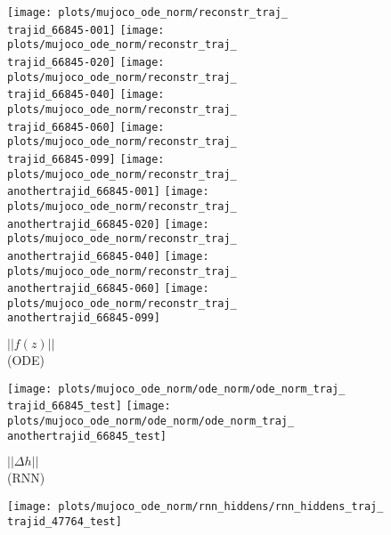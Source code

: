 \documentclass{article}
\begin{document}
\begin{figure*}[b]
\begin{subfigure}[b]{0.9\linewidth}
		\centering
		\texttt{[image: plots/mujoco\_ode\_norm/reconstr\_traj\_\\trajid\_66845-001]}
		\texttt{[image: plots/mujoco\_ode\_norm/reconstr\_traj\_\\trajid\_66845-020]}
		\texttt{[image: plots/mujoco\_ode\_norm/reconstr\_traj\_\\trajid\_66845-040]}
		\texttt{[image: plots/mujoco\_ode\_norm/reconstr\_traj\_\\trajid\_66845-060]}
		\texttt{[image: plots/mujoco\_ode\_norm/reconstr\_traj\_\\trajid\_66845-099]}
		\hfill
		\texttt{[image: plots/mujoco\_ode\_norm/reconstr\_traj\_\\anothertrajid\_66845-001]}
		\texttt{[image: plots/mujoco\_ode\_norm/reconstr\_traj\_\\anothertrajid\_66845-020]}
		\texttt{[image: plots/mujoco\_ode\_norm/reconstr\_traj\_\\anothertrajid\_66845-040]}
		\texttt{[image: plots/mujoco\_ode\_norm/reconstr\_traj\_\\anothertrajid\_66845-060]}
		\texttt{[image: plots/mujoco\_ode\_norm/reconstr\_traj\_\\anothertrajid\_66845-099]}
	\end{subfigure}
\begin{subfigure}[b]{0.06\linewidth}
	\footnotesize
	$||f(z)||$\\(ODE)
	\vspace{1mm}
\end{subfigure}
\begin{subfigure}[b]{0.93\linewidth}
		\centering
		\texttt{[image: plots/mujoco\_ode\_norm/ode\_norm/ode\_norm\_traj\_\\trajid\_66845\_test]}
\texttt{[image: plots/mujoco\_ode\_norm/ode\_norm/ode\_norm\_traj\_\\anothertrajid\_66845\_test]}
	\end{subfigure}
\vspace{-5mm}
\begin{subfigure}[b]{0.06\linewidth}
	{\footnotesize $||\Delta h||$\\(RNN)}
	\vspace{2mm}
	\end{subfigure}
\begin{subfigure}[b]{0.93\linewidth}
		\centering
		\texttt{[image: plots/mujoco\_ode\_norm/rnn\_hiddens/rnn\_hiddens\_traj\_\\trajid\_47764\_test]}

\end{subfigure}
\end{figure*}
\end{document}
